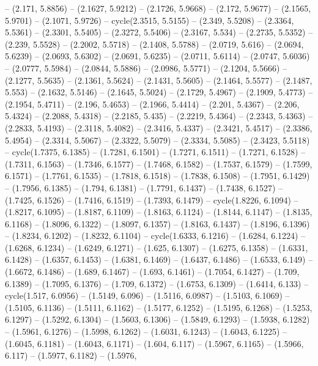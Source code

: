 {   -- (2.171, 5.8856) -- (2.1627, 5.9212) -- (2.1726, 5.9668) -- (2.172, 5.9677)
   -- (2.1565, 5.9701) -- (2.1071, 5.9726) -- cycle(2.3515, 5.5155) -- (2.349, 
  5.5208) -- (2.3364, 5.5361) -- (2.3301, 5.5405) -- (2.3272, 5.5406) -- 
  (2.3167, 5.534) -- (2.2735, 5.5352) -- (2.239, 5.5528) -- (2.2002, 5.5718) -- 
  (2.1408, 5.5788) -- (2.0719, 5.616) -- (2.0694, 5.6239) -- (2.0693, 5.6302) --
   (2.0691, 5.6235) -- (2.0711, 5.6114) -- (2.0747, 5.6036) -- (2.0777, 5.5984) 
  -- (2.0844, 5.5886) -- (2.0986, 5.5771) -- (2.1204, 5.5666) -- (2.1277, 
  5.5635) -- (2.1361, 5.5624) -- (2.1431, 5.5605) -- (2.1464, 5.5577) -- 
  (2.1487, 5.553) -- (2.1632, 5.5146) -- (2.1645, 5.5024) -- (2.1729, 5.4967) --
   (2.1909, 5.4773) -- (2.1954, 5.4711) -- (2.196, 5.4653) -- (2.1966, 5.4414) 
  -- (2.201, 5.4367) -- (2.206, 5.4324) -- (2.2088, 5.4318) -- (2.2185, 5.435) 
  -- (2.2219, 5.4364) -- (2.2343, 5.4363) -- (2.2833, 5.4193) -- (2.3118, 
  5.4082) -- (2.3416, 5.4337) -- (2.3421, 5.4517) -- (2.3386, 5.4954) -- 
  (2.3314, 5.5067) -- (2.3322, 5.5079) -- (2.3334, 5.5085) -- (2.3423, 5.5118) 
  -- cycle(1.7375, 6.1385) -- (1.7281, 6.1501) -- (1.7271, 6.1511) -- (1.7271, 
  6.1528) -- (1.7311, 6.1563) -- (1.7346, 6.1577) -- (1.7468, 6.1582) -- 
  (1.7537, 6.1579) -- (1.7599, 6.1571) -- (1.7761, 6.1535) -- (1.7818, 6.1518) 
  -- (1.7838, 6.1508) -- (1.7951, 6.1429) -- (1.7956, 6.1385) -- (1.794, 6.1381)
   -- (1.7791, 6.1437) -- (1.7438, 6.1527) -- (1.7425, 6.1526) -- (1.7416, 
  6.1519) -- (1.7393, 6.1479) -- cycle(1.8226, 6.1094) -- (1.8217, 6.1095) -- 
  (1.8187, 6.1109) -- (1.8163, 6.1124) -- (1.8144, 6.1147) -- (1.8135, 6.1168) 
  -- (1.8096, 6.1322) -- (1.8097, 6.1357) -- (1.8163, 6.1437) -- (1.8196, 
  6.1396) -- (1.8234, 6.1202) -- (1.8232, 6.1104) -- cycle(1.6333, 6.1216) -- 
  (1.6284, 6.1224) -- (1.6268, 6.1234) -- (1.6249, 6.1271) -- (1.625, 6.1307) --
   (1.6275, 6.1358) -- (1.6331, 6.1428) -- (1.6357, 6.1453) -- (1.6381, 6.1469) 
  -- (1.6437, 6.1486) -- (1.6533, 6.149) -- (1.6672, 6.1486) -- (1.689, 6.1467) 
  -- (1.693, 6.1461) -- (1.7054, 6.1427) -- (1.709, 6.1389) -- (1.7095, 6.1376) 
  -- (1.709, 6.1372) -- (1.6753, 6.1309) -- (1.6414, 6.133) -- cycle(1.517, 
  6.0956) -- (1.5149, 6.096) -- (1.5116, 6.0987) -- (1.5103, 6.1069) -- (1.5105,
   6.1136) -- (1.5111, 6.1162) -- (1.5177, 6.1252) -- (1.5195, 6.1268) -- 
  (1.5253, 6.1297) -- (1.5292, 6.1304) -- (1.5603, 6.1306) -- (1.5849, 6.1293) 
  -- (1.5938, 6.1282) -- (1.5961, 6.1276) -- (1.5998, 6.1262) -- (1.6031, 
  6.1243) -- (1.6043, 6.1225) -- (1.6045, 6.1181) -- (1.6043, 6.1171) -- (1.604,
   6.117) -- (1.5967, 6.1165) -- (1.5966, 6.117) -- (1.5977, 6.1182) -- (1.5976,
}
